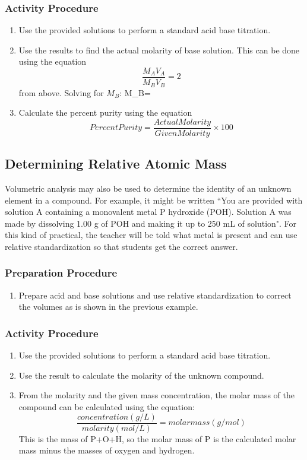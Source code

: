 \subsubsection{Activity Procedure}
\begin{enumerate}
\item {Use the provided solutions to perform a standard acid base titration.}
\item{Use the results to find the actual molarity of base solution. This can be done using the equation 
$$\frac{M_A V_A}{M_B V_B}=2$$
from above. Solving for $M_B$:
$$M_B=}$$
\item {Calculate the percent purity using the equation
$$Percent Purity = \frac{Actual  Molarity}{Given  Molarity}\times 100$$}
\end{enumerate}


\subsection{Determining Relative Atomic Mass}

Volumetric analysis may also be used to determine the identity of an unknown element in a compound. For example, it might be written ``You are provided with solution A containing a monovalent metal P hydroxide (POH). Solution A was made by dissolving 1.00 g of POH and making it up to 250 mL of solution". For this kind of practical, the teacher will be told what metal is present and can use relative standardization so that students get the correct answer.

\subsubsection{Preparation Procedure}
\begin{enumerate}
\item{Prepare acid and base solutions and use relative standardization to correct the volumes as is shown in the previous example.}
\end{enumerate}
\subsubsection{Activity Procedure}
\begin{enumerate}
\item{Use the provided solutions to perform a standard acid base titration.}
\item{Use the result to calculate the molarity of the unknown compound.}
\item{ From the molarity and the given mass concentration, the molar mass of the compound can be calculated using the equation: 
$$\frac{concentration(g/L)}{molarity(mol/L)}={molar mass(g/mol)}$$
This is the mass of P+O+H, so the molar mass of P is the calculated molar mass minus the masses of oxygen and hydrogen.}
\end{enumerate}



